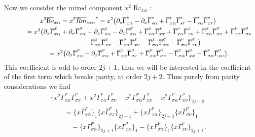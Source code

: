 \documentclass[pdftex]{sigma}
\numberwithin{equation}{section}
\newcommand{\olGamma}{\overline{\Gamma}}
\DeclareMathOperator{\Rc}{Rc}
\begin{document}
Now we consider the mixed component $x^2 \overline{\Rc}_{x\alpha}$:
\begin{gather*}
x^2 \overline{\Rc}_{x \alpha} = x^2 {\overline{Rm}_{s x \alpha}}^{s}
= x^2 \big( \partial_s \olGamma_{x \alpha}^s - \partial_{x} \olGamma_{s \alpha}^s + \olGamma_{x \alpha}^r \olGamma_{sr}^s - \olGamma_{s \alpha}^r \olGamma_{x r}^s \big) \\
\hphantom{x^2 \overline{\Rc}_{x \alpha}}{}= x^2 \big( \partial_x \olGamma_{x \alpha}^x + \partial_{\sigma} \olGamma_{x \alpha}^{\sigma} - \partial_{x} \olGamma_{x \alpha}^x - \partial_{x} \olGamma_{\sigma \alpha}^{\sigma}
 + \olGamma_{x \alpha}^x \olGamma_{xx}^x + \olGamma_{x \alpha}^{\nu} \olGamma_{x\nu}^x + \olGamma_{x \alpha}^x \olGamma_{\sigma x}^{\sigma} + \olGamma_{x \alpha}^{\nu} \olGamma_{\sigma \nu}^{\sigma} \\
\hphantom{x^2 \overline{\Rc}_{x \alpha}=}{} - \olGamma_{x \alpha}^x \olGamma_{x x}^x - \olGamma_{x \alpha}^{\nu} \olGamma_{x \nu}^x
- \olGamma_{\sigma \alpha}^x \olGamma_{x x}^{\sigma}- \olGamma_{\sigma \alpha}^{\nu} \olGamma_{x \nu}^{\sigma} \big) \\
\hphantom{x^2 \overline{\Rc}_{x \alpha}}{}= x^2 \big( \partial_{\sigma} \olGamma_{x \alpha}^{\sigma} - \partial_{x} \olGamma_{\sigma \alpha}^{\sigma}+ \olGamma_{x \alpha}^x \olGamma_{\sigma x}^{\sigma} + \olGamma_{x \alpha}^{\nu} \olGamma_{\sigma \nu}^{\sigma} - \olGamma_{\sigma \alpha}^x \olGamma_{x x}^{\sigma}- \olGamma_{\sigma \alpha}^{\nu} \olGamma_{x \nu}^{\sigma} \big).
\end{gather*}
This coefficient is odd to order $2j+1$, thus we will be interested in the coefficient of the first term which breaks parity, at order $2j+2$. Thus purely from parity considerations we find
\begin{gather}
\big\{ x^2\olGamma_{x \alpha}^x \olGamma_{\sigma x}^{\sigma} + x^2\olGamma_{x \alpha}^{\nu} \olGamma_{\sigma \nu}^{\sigma} - x^2 \olGamma_{\sigma \alpha}^x \olGamma_{x x}^{\sigma}- x^2\olGamma_{\sigma \alpha}^{\nu} \olGamma_{x \nu}^{\sigma} \big\}_{2j+2} \nonumber \\
\qquad{} = \big\{x\olGamma_{x \alpha}^x\big\}_1 \big\{ x\olGamma_{\sigma x}^{\sigma}\big\}_{2j+1}+ \big\{x\olGamma_{x \alpha}^{\nu}\big\}_{2j+1} \big\{ x\olGamma_{\sigma \nu}^{\sigma}\big\}_1 \nonumber \\
\qquad\quad {}- \big\{x \olGamma_{\sigma \alpha}^x\big\}_{2j+1} \big\{ x\olGamma_{x x}^{\sigma}\big\}_1 - \big\{x\olGamma_{\sigma \alpha}^{\nu}\big\}_1 \big\{ x\olGamma_{x \nu}^{\sigma}\big\}_{2j+1}.\label{eqn:mixed-ref-3}
\end{gather}
\end{document}
